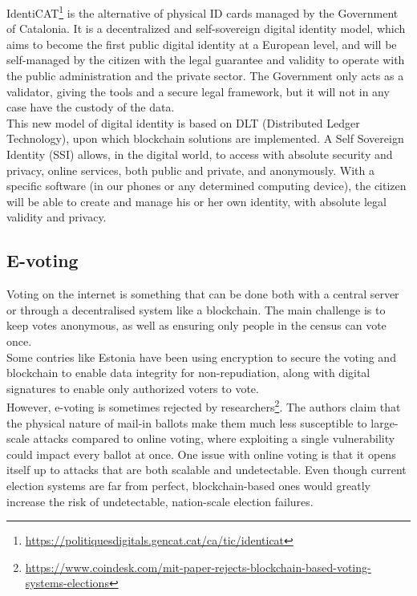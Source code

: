 \documentclass[10pt]{article}
\begin{document}
\begin{multicols}{2}
IdentiCAT\footnote{\url{https://politiquesdigitals.gencat.cat/ca/tic/identicat}} is the alternative of physical ID cards managed by the Government of Catalonia. It is a decentralized and self-sovereign digital identity model, which aims to become the first public digital identity at a European level, and will be self-managed by the citizen with the legal guarantee and validity to operate with the public administration and the private sector. The Government only acts as a validator, giving the tools and a secure legal framework, but it will not in any case have the custody of the data.\\

This new model of digital identity is based on DLT (Distributed Ledger Technology), upon which blockchain solutions are implemented. A Self Sovereign Identity (SSI) allows, in the digital world, to access with absolute security and privacy, online services, both public and private, and anonymously. With a specific software (in our phones or any determined computing device), the citizen will be able to create and manage his or her own identity, with absolute legal validity and privacy.

\subsection{E-voting}

Voting on the internet is something that can be done both with a central server or through a decentralised system like a blockchain. The main challenge is to keep votes anonymous, as well as ensuring only people in the census can vote once.\\

Some contries like Estonia have been using encryption to secure the voting and blockchain to enable data integrity for non-repudiation, along with digital signatures to enable only authorized voters to vote.\\

However, e-voting is sometimes rejected by researchers\footnote{\url{https://www.coindesk.com/mit-paper-rejects-blockchain-based-voting-systems-elections}}. The authors claim that the physical nature of mail-in ballots make them much less susceptible to large-scale attacks compared to online voting, where exploiting a single vulnerability could impact every ballot at once. One issue with online voting is that it opens itself up to attacks that are both scalable and undetectable. Even though current election systems are far from perfect, blockchain-based ones would greatly increase the risk of undetectable, nation-scale election failures.\\


\end{multicols}
\end{document}
